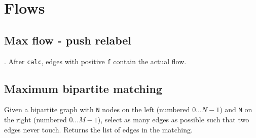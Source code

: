 \section{Flows}

\subsection{Max flow - push relabel}
. After \verb|calc|, edges with positive \verb|f| contain the actual flow.


\subsection{Maximum bipartite matching}
Given a bipartite graph with \verb|N| nodes on the left (numbered $0 \ldots N-1$) and \verb|M| on the right (numbered $0 \ldots M-1$), select as many edges as possible such that two edges never touch. Returns the list of edges in the matching.


